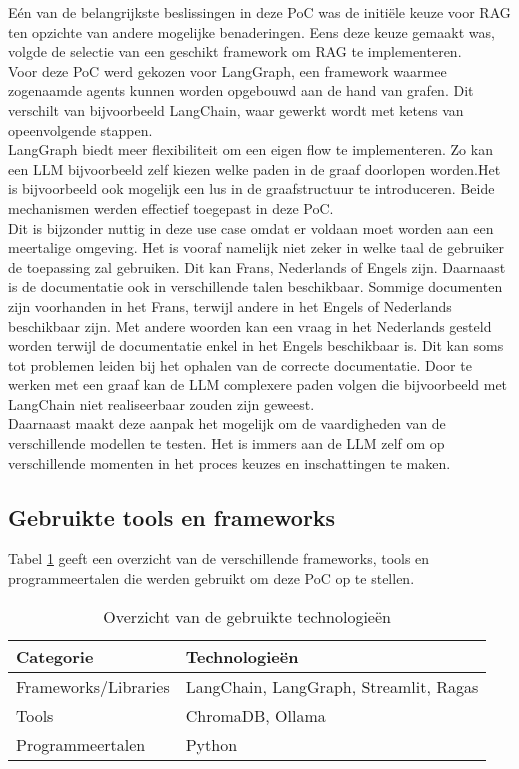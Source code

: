 Eén van de belangrijkste beslissingen in deze PoC was de initiële keuze voor RAG ten opzichte van andere mogelijke benaderingen. Eens deze keuze gemaakt was, volgde de selectie van een geschikt framework om RAG te implementeren.
\\[1em]
Voor deze PoC werd gekozen voor LangGraph, een framework waarmee zogenaamde agents kunnen worden opgebouwd aan de hand van grafen. Dit verschilt van bijvoorbeeld LangChain, waar gewerkt wordt met ketens van opeenvolgende stappen.
\\[1em]
LangGraph biedt meer flexibiliteit om een eigen flow te implementeren. Zo kan een LLM bijvoorbeeld zelf kiezen welke paden in de graaf doorlopen worden.Het is bijvoorbeeld ook mogelijk een lus in de graafstructuur te introduceren. Beide mechanismen werden effectief toegepast in deze PoC.
\\[1em]
Dit is bijzonder nuttig in deze use case omdat er voldaan moet worden aan een meertalige omgeving. Het is vooraf namelijk niet zeker in welke taal de gebruiker de toepassing zal gebruiken. Dit kan Frans, Nederlands of Engels zijn. Daarnaast is de documentatie ook in verschillende talen beschikbaar. Sommige documenten zijn voorhanden in het Frans, terwijl andere in het Engels of Nederlands beschikbaar zijn. Met andere woorden kan een vraag in het Nederlands gesteld worden terwijl de documentatie enkel in het Engels beschikbaar is. Dit kan soms tot problemen leiden bij het ophalen van de correcte documentatie. Door te werken met een graaf kan de LLM complexere paden volgen die bijvoorbeeld met LangChain niet realiseerbaar zouden zijn geweest.
\\[1em]
Daarnaast maakt deze aanpak het mogelijk om de vaardigheden van de verschillende modellen te testen. Het is immers aan de LLM zelf om op verschillende momenten in het proces keuzes en inschattingen te maken.

\subsection{Gebruikte tools en frameworks}
Tabel \ref{tab:gebruikte_technologieen} geeft een overzicht van de verschillende frameworks, tools en programmeertalen die werden gebruikt om deze PoC op te stellen.

\begin{table}[H]
    \begin{tabular}{|l|l|}
        \hline
        \textbf{Categorie}       & \textbf{Technologieën}               \\ \hline
        Frameworks/Libraries     & LangChain, LangGraph, Streamlit, Ragas \\ \hline
        Tools                   & ChromaDB, Ollama                    \\ \hline
        Programmeertalen        & Python                             \\ \hline
    \end{tabular}
    \caption{Overzicht van de gebruikte technologieën}
    \label{tab:gebruikte_technologieen}
\end{table}

